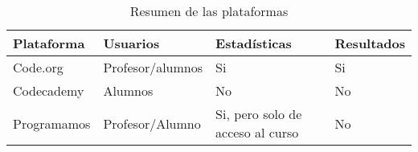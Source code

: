 \begin{table}[!ht]
    \begin{center}
    \begin{tabular}{|p{40mm}|p{40mm}|p{30mm}|p{30mm}|} \hline 
    \textbf{Plataforma} & \textbf{Usuarios} & \textbf{Estadísticas} & \textbf{Resultados}\\ \hline
    Code.org & Profesor/alumnos & Si & Si \\ \hline
    
    Codecademy & Alumnos & No & No \\ \hline
    
    Programamos & Profesor/Alumno & Si, pero solo de acceso al curso & No \\ \hline
    
    \end{tabular}
    \end{center}
    \caption{Resumen de las plataformas}
    \label{table:resOthers}
    \end{table}
